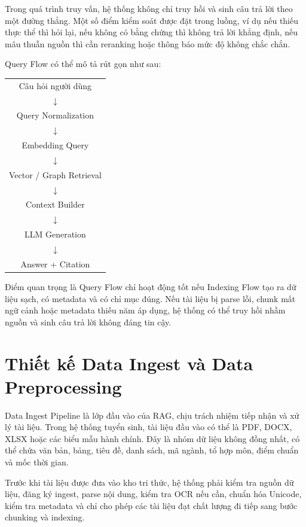 Trong quá trình truy vấn, hệ thống không chỉ truy hồi và sinh câu trả lời theo một đường thẳng. Một số điểm kiểm soát được đặt trong luồng, ví dụ nếu thiếu thực thể thì hỏi lại, nếu không có bằng chứng thì không trả lời khẳng định, nếu mâu thuẫn nguồn thì cần reranking hoặc thông báo mức độ không chắc chắn.

Query Flow có thể mô tả rút gọn như sau:

\begin{center}
\begin{tabular}{c}
Câu hỏi người dùng \\
$\downarrow$ \\
Query Normalization \\
$\downarrow$ \\
Embedding Query \\
$\downarrow$ \\
Vector / Graph Retrieval \\
$\downarrow$ \\
Context Builder \\
$\downarrow$ \\
LLM Generation \\
$\downarrow$ \\
Answer + Citation
\end{tabular}
\end{center}

Điểm quan trọng là Query Flow chỉ hoạt động tốt nếu Indexing Flow tạo ra dữ liệu sạch, có metadata và có chỉ mục đúng. Nếu tài liệu bị parse lỗi, chunk mất ngữ cảnh hoặc metadata thiếu năm áp dụng, hệ thống có thể truy hồi nhầm nguồn và sinh câu trả lời không đáng tin cậy.

\section{Thiết kế Data Ingest và Data Preprocessing}

Data Ingest Pipeline là lớp đầu vào của RAG, chịu trách nhiệm tiếp nhận và xử lý tài liệu. Trong hệ thống tuyển sinh, tài liệu đầu vào có thể là PDF, DOCX, XLSX hoặc các biểu mẫu hành chính. Đây là nhóm dữ liệu không đồng nhất, có thể chứa văn bản, bảng, tiêu đề, danh sách, mã ngành, tổ hợp môn, điểm chuẩn và mốc thời gian.

Trước khi tài liệu được đưa vào kho tri thức, hệ thống phải kiểm tra nguồn dữ liệu, đăng ký ingest, parse nội dung, kiểm tra OCR nếu cần, chuẩn hóa Unicode, kiểm tra metadata và chỉ cho phép các tài liệu đạt chất lượng đi tiếp sang bước chunking và indexing.

